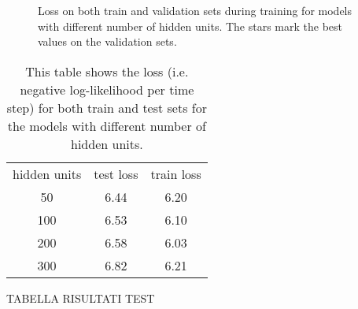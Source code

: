 \begin{figure}
	\centering
\resizebox{13cm}{!}{
	
}
\caption{Loss on both train and validation sets during training for models with different number of hidden units. The stars mark the best values on the validation sets.}
\label{fig:overfitting_muse}
\end{figure}

\begin{table}
	\centering
\begin{tabular}{c | c | c}
	hidden units & test loss & train loss \\
	50 & 6.44 & 6.20  \\
	100 & 6.53 & 6.10 \\
	200 & 6.58 & 6.03 \\
	300 & 6.82 & 6.21 \\
\end{tabular}
\caption{This table shows the loss (i.e. negative log-likelihood per time step) for both train and test sets for the models with different number of hidden units.}
\label{table:losses_n_hidden}
\end{table}


TABELLA RISULTATI TEST

